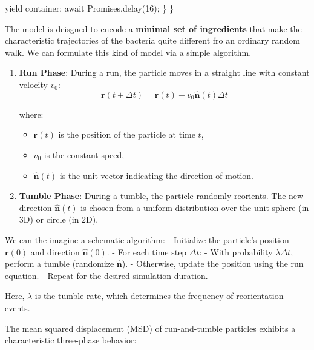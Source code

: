 \documentclass[
  letterpaper,
  enabledeprecatedfontcommands]{report}
\newenvironment{Shaded}{\begin{snugshade}}{\end{snugshade}}
\newcommand{\NormalTok}[1]{\textcolor[rgb]{0.00,0.23,0.31}{#1}}
\providecommand{\tightlist}{%
  \setlength{\itemsep}{0pt}\setlength{\parskip}{0pt}}
\begin{document}
\begin{Shaded}
\begin{Highlighting}[]
\NormalTok{        yield container;}
\NormalTok{        await Promises.delay(16);}
\NormalTok{    \}}
\NormalTok{\}}
\end{Highlighting}
\end{Shaded}

The model is deisgned to encode a \textbf{minimal set of ingredients}
that make the characteristic trajectories of the bacteria quite
different fro an ordinary random walk. We can formulate this kind of
model via a simple algorithm.

\begin{enumerate}
\def\labelenumi{\arabic{enumi}.}
\item
  \textbf{Run Phase}: During a run, the particle moves in a straight
  line with constant velocity \(v_0\): \[
   \mathbf{r}(t + \Delta t) = \mathbf{r}(t) + v_0 \hat{\mathbf{n}}(t) \Delta t
   \]

  where:

  \begin{itemize}
  \tightlist
  \item
    \(\mathbf{r}(t)\) is the position of the particle at time \(t\),
  \item
    \(v_0\) is the constant speed,
  \item
    \(\hat{\mathbf{n}}(t)\) is the unit vector indicating the direction
    of motion.
  \end{itemize}
\item
  \textbf{Tumble Phase}: During a tumble, the particle randomly
  reorients. The new direction \(\hat{\mathbf{n}}(t)\) is chosen from a
  uniform distribution over the unit sphere (in 3D) or circle (in 2D).
\end{enumerate}

We can the imagine a schematic algorithm: - Initialize the particle's
position \(\mathbf{r}(0)\) and direction \(\hat{\mathbf{n}}(0)\). - For
each time step \(\Delta t\): - With probability \(\lambda \Delta t\),
perform a tumble (randomize \(\hat{\mathbf{n}}\)). - Otherwise, update
the position using the run equation. - Repeat for the desired simulation
duration.

Here, \(\lambda\) is the tumble rate, which determines the frequency of
reorientation events.

The mean squared displacement (MSD) of run-and-tumble particles exhibits
a characteristic three-phase behavior:
\end{document}
